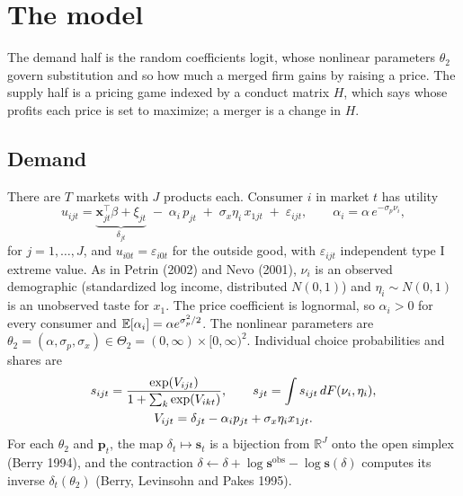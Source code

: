\section{The model}\label{blp:sec:model}

The demand half is the random coefficients logit, whose nonlinear parameters $\theta_2$ govern substitution and so how much a merged firm gains by raising a price. The supply half is a pricing game indexed by a conduct matrix $H$, which says whose profits each price is set to maximize; a merger is a change in $H$.

\subsection{Demand}
There are $T$ markets with $J$ products each. Consumer $i$ in market $t$ has utility
\begin{equation}\label{blp:eq:utility}
  u_{ijt} = \underbrace{\bm x_{jt}^\top \beta + \xi_{jt}}_{\delta_{jt}}
  \;-\; \alpha_i\, p_{jt} \;+\; \sigma_x \eta_i\, x_{1jt} \;+\; \varepsilon_{ijt},
  \qquad \alpha_i = \alpha\, e^{-\sigma_p \nu_i},
\end{equation}
for $j=1,\dots,J$, and $u_{i0t} = \varepsilon_{i0t}$ for the outside good, with
$\varepsilon_{ijt}$ independent type I extreme value. As in Petrin (2002) and Nevo (2001),
$\nu_i$ is an observed demographic (standardized log income, distributed $N(0,1)$) and
$\eta_i\sim N(0,1)$ is an unobserved taste for $x_1$. The price coefficient is lognormal, so
$\alpha_i>0$ for every consumer and $\mathbb{E}[\alpha_i] = \alpha e^{\sigma_p^2/2}$. The nonlinear
parameters are $\theta_2 = (\alpha,\sigma_p,\sigma_x)\in\Theta_2 = (0,\infty)\times[0,\infty)^2$.
Individual choice probabilities and shares are
\begin{gather}\label{blp:eq:shares}
  s_{ijt} = \frac{\exp(V_{ijt})}{1 + \sum_k \exp(V_{ikt})},\qquad
  s_{jt} = \int s_{ijt}\, dF(\nu_i,\eta_i),\\
  V_{ijt} = \delta_{jt} - \alpha_i p_{jt} + \sigma_x\eta_i x_{1jt}.\notag
\end{gather}
For each $\theta_2$ and $\bm p_t$, the map $\delta_t\mapsto\bm s_t$ is a bijection from
$\mathbb R^J$ onto the open simplex (Berry 1994), and the contraction
$\delta \leftarrow \delta + \log \bm s^{\mathrm{obs}} - \log \bm s(\delta)$ computes its inverse
$\delta_t(\theta_2)$ (Berry, Levinsohn and Pakes 1995).

